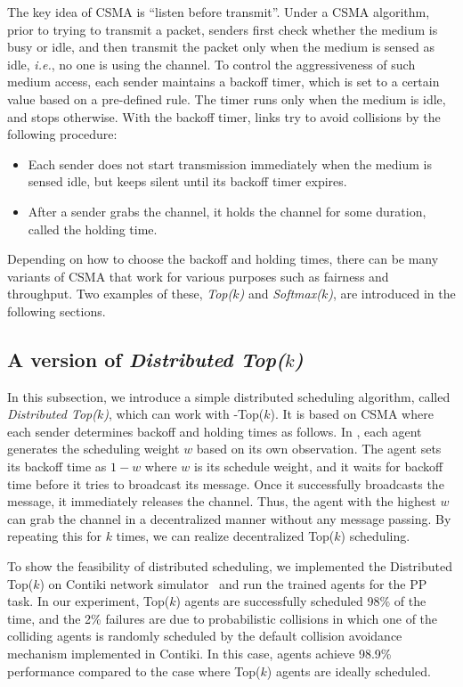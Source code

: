  The key idea of CSMA is ``listen
before transmit''. Under a CSMA algorithm, prior to trying to transmit
a packet, senders first check whether the medium is busy or idle, and
then transmit the packet only when the medium is sensed as idle, {\em i.e.}, no
one is using the channel. To control the aggressiveness of such medium
access, each sender maintains a backoff timer, which is set to a
certain value based on a pre-defined rule. The timer runs only when
the medium is idle, and stops otherwise. With the backoff timer, links
try to avoid collisions by the following procedure:
\begin{itemize}
\item Each sender does not start transmission immediately when the
  medium is sensed idle, but keeps silent until its backoff timer
  expires.
\item After a sender grabs the channel, it holds the channel for some
  duration, called the holding time.
\end{itemize}
Depending on how to choose the backoff and holding times, there can be
many variants of CSMA that work for various purposes such as fairness
and throughput. Two examples of these, {\em Top($k$)}
and {\em Softmax($k$)}, are introduced in the following sections.


\subsection{A version of {\em Distributed Top($k$)} }
In this subsection, we introduce a simple distributed scheduling
algorithm, called {\em Distributed Top($k$)}, which can work with
\sched -Top($k$). It is based on CSMA where each sender determines
backoff and holding times as follows.  In \sched, each agent generates
the scheduling weight $w$ based on its own observation. The agent sets its
backoff time as $1-w$ where $w$ is its schedule weight, and it waits
for backoff time before it tries to broadcast its message. Once it
successfully broadcasts the message, it immediately releases the channel.
Thus, the agent with the highest $w$ can grab the channel in a
decentralized manner without any message passing. By repeating this
for $k$ times, we can realize decentralized Top($k$) scheduling.

To show the feasibility of distributed scheduling, we implemented the
Distributed Top($k$) on Contiki network simulator~\citep{contiki} and
run the trained agents for the PP task. In our experiment, Top($k$) agents
are successfully scheduled 98\% of the time, and the 2\% failures are
due to probabilistic collisions in which one of the colliding agents is
randomly scheduled by the default collision avoidance mechanism implemented in
Contiki. In this case, agents achieve 98.9\% performance compared to
the case where Top($k$) agents are ideally scheduled.


